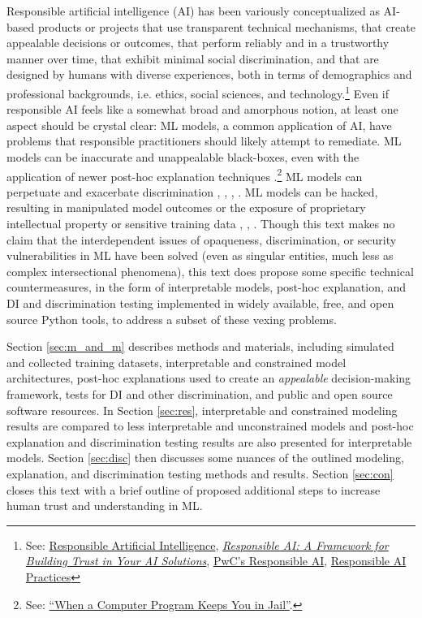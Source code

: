 \documentclass[information,article,submit,moreauthors,pdftex]{definitions/mdpi}
\begin{document}
Responsible artificial intelligence (AI) has been variously conceptualized as AI-based products or projects that use transparent technical mechanisms, that create appealable decisions or outcomes, that perform reliably and in a trustworthy manner over time, that exhibit minimal social discrimination, and that are designed by humans with diverse experiences, both in terms of demographics and professional backgrounds, i.e. ethics, social sciences, and technology.\footnote{See: \href{https://ec.europa.eu/jrc/communities/sites/jrccties/files/03_dignum_v.pdf}{Responsible Artificial Intelligence}, \href{https://www.accenture.com/_acnmedia/pdf-92/accenture-afs-responsible-ai.pdf}{\textit{Responsible AI: A Framework for Building Trust in Your AI Solutions}}, \href{https://www.pwc.com/us/en/services/consulting/analytics/artificial-intelligence/what-is-responsible-ai.html}{PwC's Responsible AI}, \href{https://ai.google/responsibilities/responsible-ai-practices/}{Responsible AI Practices}} Even if responsible AI feels like a somewhat broad and amorphous notion, at least one aspect should be crystal clear: ML models, a common application of AI, have problems that responsible practitioners should likely attempt to remediate. ML models can be inaccurate and unappealable black-boxes, even with the application of newer post-hoc explanation techniques \cite{please_stop}.\footnote{See: \href{https://www.nytimes.com/2017/06/13/opinion/how-computers-are-harming-criminal-justice.html}{``When a Computer Program Keeps You in Jail''}.} ML models can perpetuate and exacerbate discrimination \cite{fairmlbook}, \cite{feldman2015certifying}, \cite{dwork2012fairness}, \cite{gender_shades}.  ML models can be hacked, resulting in manipulated model outcomes or the exposure of proprietary intellectual property or sensitive training data \cite{security_of_ml}, \cite{model_stealing}, \cite{membership_inference}. Though this text makes no claim that the interdependent issues of opaqueness, discrimination, or security vulnerabilities in ML have been solved (even as singular entities, much less as complex intersectional phenomena), this text does propose some specific technical countermeasures, in the form of interpretable models, post-hoc explanation, and DI and discrimination testing implemented in widely available, free, and open source Python tools, to address a subset of these vexing problems.

Section \ref{sec:m_and_m} describes methods and materials, including simulated and collected training datasets, interpretable and constrained model architectures, post-hoc explanations used to create an \textit{appealable} decision-making framework, tests for DI and other discrimination, and public and open source software resources. In Section \ref{sec:res}, interpretable and constrained modeling results are compared to less interpretable and unconstrained models and post-hoc explanation and discrimination testing results are also presented for interpretable models. Section \ref{sec:disc} then discusses some nuances of the outlined modeling, explanation, and discrimination testing methods and results. Section \ref{sec:con} closes this text with a brief outline of proposed additional steps to increase human trust and understanding in ML.
\end{document}
